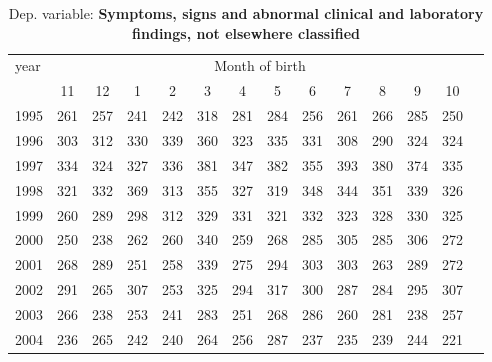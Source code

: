  \begin{table}[H] \begin{threeparttable} \centering \caption{Dep. variable: \textbf{Symptoms, signs and abnormal clinical and laboratory findings, not elsewhere classified}} {\def\sym#1{\ifmmode^{#1}\else\(^{#1}\)\fi} \begin{tabular}{l*{13}{c}} \toprule year & \multicolumn{12}{c}{Month of birth} \\ \cmidrule(lr){2-13} 
            &          11&          12&           1&           2&           3&           4&           5&           6&           7&           8&           9&          10\\
1995        &         261&         257&         241&         242&         318&         281&         284&         256&         261&         266&         285&         250\\
1996        &         303&         312&         330&         339&         360&         323&         335&         331&         308&         290&         324&         324\\
1997        &         334&         324&         327&         336&         381&         347&         382&         355&         393&         380&         374&         335\\
1998        &         321&         332&         369&         313&         355&         327&         319&         348&         344&         351&         339&         326\\
1999        &         260&         289&         298&         312&         329&         331&         321&         332&         323&         328&         330&         325\\
2000        &         250&         238&         262&         260&         340&         259&         268&         285&         305&         285&         306&         272\\
2001        &         268&         289&         251&         258&         339&         275&         294&         303&         303&         263&         289&         272\\
2002        &         291&         265&         307&         253&         325&         294&         317&         300&         287&         284&         295&         307\\
2003        &         266&         238&         253&         241&         283&         251&         268&         286&         260&         281&         238&         257\\
2004        &         236&         265&         242&         240&         264&         256&         287&         237&         235&         239&         244&         221\\

\end{tabular}}
\end{threeparttable}
\end{table}
